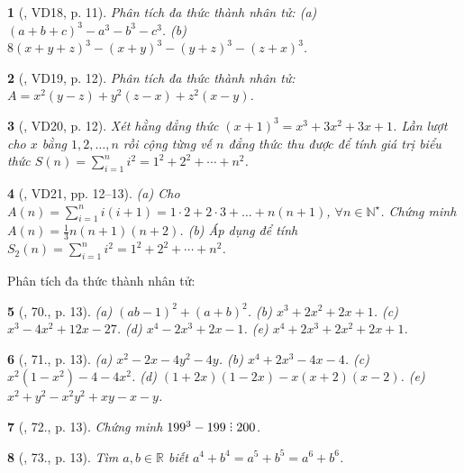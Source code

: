 \documentclass{article}
\newtheorem{baitoan}{}
\DeclareRobustCommand{\divby}{%
	\mathrel{\vbox{\baselineskip.65ex\lineskiplimit0pt\hbox{.}\hbox{.}\hbox{.}}}%
}
\begin{document}
\begin{baitoan}[\cite{Binh_Toan_8_tap_1}, VD18, p. 11]
	Phân tích đa thức thành nhân tử: (a) $(a + b + c)^3 - a^3 - b^3 - c^3$. (b) $8(x + y + z)^3 - (x + y)^3 - (y + z)^3 - (z + x)^3$.
\end{baitoan}

\begin{baitoan}[\cite{Binh_Toan_8_tap_1}, VD19, p. 12]
	Phân tích đa thức thành nhân tử: $A = x^2(y - z) + y^2(z - x) + z^2(x - y)$.
\end{baitoan}

\begin{baitoan}[\cite{Binh_Toan_8_tap_1}, VD20, p. 12]
	Xét hằng đẳng thức $(x + 1)^3 = x^3 + 3x^2 + 3x + 1$. Lần lượt cho $x$ bằng $1,2,\ldots,n$ rồi cộng từng vế $n$ đẳng thức thu được để tính giá trị biểu thức $S(n) = \sum_{i=1}^n i^2 = 1^2 + 2^2 + \cdots + n^2$.
\end{baitoan}

\begin{baitoan}[\cite{Binh_Toan_8_tap_1}, VD21, pp. 12--13]
	(a) Cho $A(n) = \sum_{i=1}^n i(i + 1) = 1\cdot2 + 2\cdot3 + \ldots + n(n + 1)$, $\forall n\in\mathbb{N}^\star$. Chứng minh $A(n) = \frac{1}{3}n(n + 1)(n + 2)$. (b) Áp dụng để tính $S_2(n) = \sum_{i=1}^n i^2 = 1^2 + 2^2 + \cdots + n^2$.
\end{baitoan}
Phân tích đa thức thành nhân tử:

\begin{baitoan}[\cite{Binh_Toan_8_tap_1}, 70., p. 13]
	(a) $(ab - 1)^2 + (a + b)^2$. (b) $x^3 + 2x^2 + 2x + 1$. (c) $x^3 - 4x^2 + 12x - 27$. (d) $x^4 - 2x^3 + 2x - 1$. (e) $x^4 + 2x^3 + 2x^2 + 2x + 1$.
\end{baitoan}

\begin{baitoan}[\cite{Binh_Toan_8_tap_1}, 71., p. 13]
	(a) $x^2 - 2x - 4y^2 - 4y$. (b) $x^4 + 2x^3 - 4x - 4$. (c) $x^2(1 - x^2) - 4 - 4x^2$. (d) $(1 + 2x)(1 - 2x) - x(x + 2)(x - 2)$. (e) $x^2 + y^2 - x^2y^2 + xy - x - y$.
\end{baitoan}

\begin{baitoan}[\cite{Binh_Toan_8_tap_1}, 72., p. 13]
	Chứng minh $199^3 - 199\divby200$.
\end{baitoan}

\begin{baitoan}[\cite{Binh_Toan_8_tap_1}, 73., p. 13]
	Tìm $a,b\in\mathbb{R}$ biết $a^4 + b^4 = a^5 + b^5 = a^6 + b^6$.
\end{baitoan}
\end{document}
